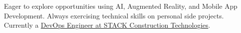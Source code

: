 \vspace{1pc}

\noindent Eager to explore opportunities using AI, Augmented Reality, and Mobile App Development. Always exercising technical skills on personal side projects. Currently a \underline{DevOps Engineer at STACK Construction Technologies}.
\vspace{1pc}